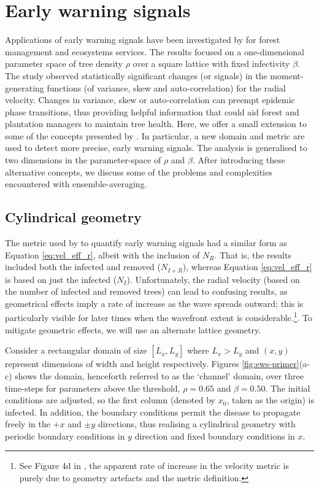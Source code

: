 \section{Early warning signals}

Applications of early warning signals have been investigated by \cite{OROZCOFUENTES201912} for forest management and ecosystems services.
The results focused on a one-dimensional parameter space of tree density $\rho$ over a square lattice with fixed infectivity $\beta$.
The study observed statistically significant changes (or signals) in the
moment-generating functions (of variance, skew and auto-correlation) for the radial velocity.
Changes in variance, skew or auto-correlation can preempt epidemic phase transitions, 
thus providing helpful information that could aid forest and plantation managers to maintain tree health. 
Here, we offer a small extension to some of the concepts presented by \cite{OROZCOFUENTES201912}.
In particular, a new domain and metric are used to detect more precise, early warning signals.  
The analysis is generalised to two dimensions in the parameter-space of $\rho$ and $\beta$. 
After introducing these alternative concepts, we discuss some of the problems and complexities encountered with ensemble-averaging. 

\subsection{Cylindrical geometry}

The metric used by \cite{OROZCOFUENTES201912} to quantify early warning signals had a similar form as Equation \ref{eq:vel_eff_r}, albeit with the inclusion of $N_R$.
That is, the results included both the infected and removed ($N_{I+R}$), whereas Equation \ref{eq:vel_eff_r} is based on just the infected ($N_I$). 
Unfortunately, the radial velocity (based on the number of infected and removed trees) can lead to confusing results, as geometrical effects imply a rate of increase as the wave spreads outward; this is particularly visible for later times when the wavefront extent is considerable.\footnote{See Figure 4d in \cite{OROZCOFUENTES201912}, the apparent rate of increase in the velocity metric is purely due to geometry artefacts and the metric definition.}.
To mitigate geometric effects, we will use an alternate lattice geometry.

Consider a rectangular domain of size $[L_x, L_y]$ where $L_x>L_y$ and $(x, y)$ represent dimensions of width and height respectively.
Figures \ref{fig:ews-primer}(a-c) shows the domain, henceforth referred to as the `channel' domain, over three time-steps for parameters above the threshold, $\rho=0.65$ and $\beta=0.50$.
The initial conditions are adjusted, so the first column (denoted by $x_0$, taken as the origin) is infected.
In addition, the boundary conditions permit the disease to propagate freely in the $+x$ and $\pm y$ directions, thus realising a cylindrical geometry with periodic boundary conditions in $y$ direction and fixed boundary conditions in $x$.

